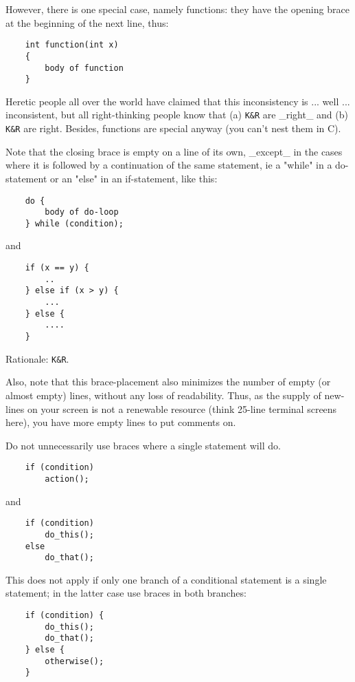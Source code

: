 \documentclass[pdftex,12pt, twocol]{article} %
\begin{document}
However, there is one special case, namely functions: they have the
opening brace at the beginning of the next line, thus:

\begin{verbatim}
	int function(int x)
	{
		body of function
	}
\end{verbatim}

Heretic people all over the world have claimed that this inconsistency
is ...  well ...  inconsistent, but all right-thinking people know that
(a) \verb+K&R+ are \_right\_ and (b) \verb+K&R+ are right.  Besides, functions are
special anyway (you can't nest them in C).

Note that the closing brace is empty on a line of its own, \_except\_ in
the cases where it is followed by a continuation of the same statement,
ie a "while" in a do-statement or an "else" in an if-statement, like
this:

\begin{verbatim}
	do {
		body of do-loop
	} while (condition);
\end{verbatim}

and

\begin{verbatim}
	if (x == y) {
		..
	} else if (x > y) {
		...
	} else {
		....
	}
\end{verbatim}

Rationale: \verb+K&R+.

Also, note that this brace-placement also minimizes the number of empty
(or almost empty) lines, without any loss of readability.  Thus, as the
supply of new-lines on your screen is not a renewable resource (think
25-line terminal screens here), you have more empty lines to put
comments on.

Do not unnecessarily use braces where a single statement will do.

\begin{verbatim}
	if (condition)
		action();
\end{verbatim}

and

\begin{verbatim}
	if (condition)
		do_this();
	else
		do_that();
\end{verbatim}

This does not apply if only one branch of a conditional statement is a single
statement; in the latter case use braces in both branches:

\begin{verbatim}
	if (condition) {
		do_this();
		do_that();
	} else {
		otherwise();
	}
\end{verbatim}
\end{document}
